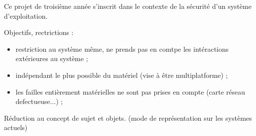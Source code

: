 \documentclass[pdftex,a4paper,titlepage,11pt]{article}
\begin{document}
Ce projet de troisième année s'inscrit dans le contexte de la sécurité d'un système d'exploitation.

Objectifs, rectrictions :
\begin{itemize}
	\item restriction au système même, ne prends pas en comtpe les intéractions extérieures au système ;
	\item indépendant le plus possible du matériel (vise à être multiplatforme) ;
	\item les failles entièrement matérielles ne sont pas prises en compte (carte réseau defectueuse...) ;
\end{itemize}




Réduction au concept de sujet et objets. (mode de représentation sur les systèmes actuels)
\end{document}
